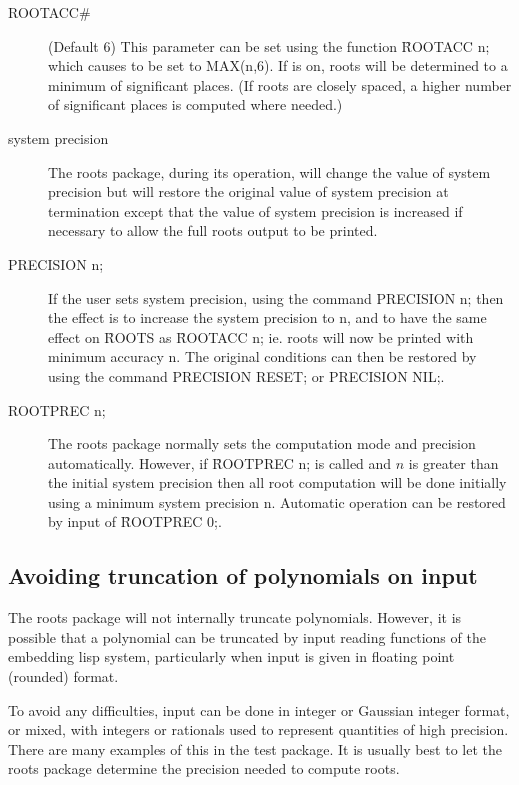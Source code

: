 \begin{description}                 
\item[ROOTACC\#] (Default 6) This parameter can be set using the function
\f{ROOTACC} n; which causes  to be set to MAX(n,6).  If  
is on, roots will be determined to a minimum of 
significant places. (If roots are closely spaced, a higher number of
significant places is computed where needed.)

\item[system precision] The roots package, during its operation, will
change the value of system precision but will restore the original value
of system precision at termination except that the value of system
precision is increased if necessary to allow the full roots output to be
printed.

\item[PRECISION n;] If the user sets system precision, using the command
PRECISION n; then the effect is to increase the system precision to n, and
to have the same effect on \f{ROOTS} as \f{ROOTACC} n; ie. roots will now be
printed with minimum accuracy n.  The original conditions can then be
restored by using the command PRECISION RESET; or PRECISION NIL;.

\item[ROOTPREC n;] The roots package normally sets the computation mode and
precision automatically.  However, if \f{ROOTPREC} n; is
called and $n$ is greater than the initial system precision then all root
computation will be done initially using a minimum system precision n.
Automatic operation can be restored by input of \f{ROOTPREC} 0;.
\end{description}


\subsection{Avoiding truncation of polynomials on input}

The roots package will not internally truncate polynomials.  However, it
is possible that a polynomial can be truncated by input reading functions
of the embedding lisp system, particularly when input is given in floating
point (rounded) format.

To avoid any difficulties, input can be done in integer or Gaussian
integer format, or mixed, with integers or rationals used to represent
quantities of high precision. There are many examples of this in the
test package.  It is usually best to let the roots package
determine the precision needed to compute roots.

